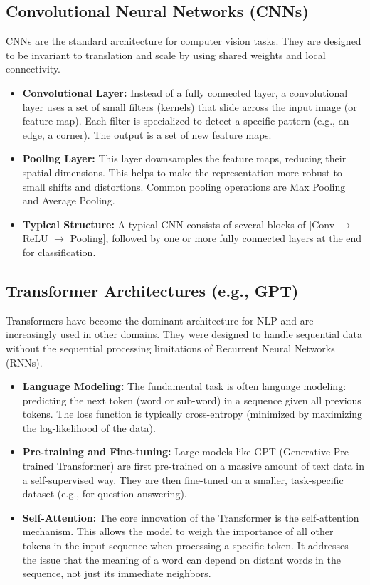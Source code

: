 \documentclass{article}
\begin{document}
\begin{multicols}{2}
\subsection{Convolutional Neural Networks (CNNs)}
CNNs are the standard architecture for computer vision tasks. They are designed to be invariant to translation and scale by using shared weights and local connectivity.
\begin{itemize}
    \item \textbf{Convolutional Layer:} Instead of a fully connected layer, a convolutional layer uses a set of small filters (kernels) that slide across the input image (or feature map). Each filter is specialized to detect a specific pattern (e.g., an edge, a corner). The output is a set of new feature maps.
    \item \textbf{Pooling Layer:} This layer downsamples the feature maps, reducing their spatial dimensions. This helps to make the representation more robust to small shifts and distortions. Common pooling operations are Max Pooling and Average Pooling.
    \item \textbf{Typical Structure:} A typical CNN consists of several blocks of [Conv $\rightarrow$ ReLU $\rightarrow$ Pooling], followed by one or more fully connected layers at the end for classification.
\end{itemize}

\subsection{Transformer Architectures (e.g., GPT)}
Transformers have become the dominant architecture for NLP and are increasingly used in other domains. They were designed to handle sequential data without the sequential processing limitations of Recurrent Neural Networks (RNNs).
\begin{itemize}
    \item \textbf{Language Modeling:} The fundamental task is often language modeling: predicting the next token (word or sub-word) in a sequence given all previous tokens. The loss function is typically cross-entropy (minimized by maximizing the log-likelihood of the data).
    \item \textbf{Pre-training and Fine-tuning:} Large models like GPT (Generative Pre-trained Transformer) are first pre-trained on a massive amount of text data in a self-supervised way. They are then fine-tuned on a smaller, task-specific dataset (e.g., for question answering).
    \item \textbf{Self-Attention:} The core innovation of the Transformer is the self-attention mechanism. This allows the model to weigh the importance of all other tokens in the input sequence when processing a specific token. It addresses the issue that the meaning of a word can depend on distant words in the sequence, not just its immediate neighbors.
\end{itemize}


\end{multicols}
\end{document}
